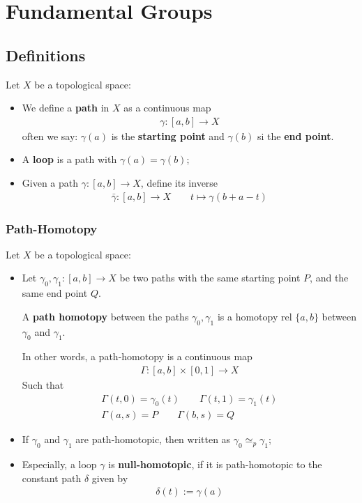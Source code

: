 \documentclass[Total.tex]{subfiles}
\begin{document}
		\chapter{Fundamental Groups}
	\section{Definitions}
	\begin{Def}
		Let $X$ be a topological space:
		\begin{itemize}
			\item We define a \textbf{path} in $X$ as a continuous map
			\begin{gather*}
				\gamma:[a,b]\rightarrow X
			\end{gather*}
			often we say: $\gamma(a)$ is the \textbf{starting point} and $\gamma(b)$ si the \textbf{end point}.
			\item A \textbf{loop} is a path with $\gamma(a)=\gamma(b)$;
			\item Given a path $\gamma:[a,b]\rightarrow X$, define its inverse 
			\begin{gather*}
				\bar{\gamma}:[a,b]\rightarrow X\qquad t\mapsto \gamma(b+a-t)
			\end{gather*}
		\end{itemize}
	\end{Def}
	
	\subsection{Path-Homotopy}
	\begin{Def}
		Let $X$ be a topological space:
		\begin{itemize}
			\item Let $\gamma_0,\gamma_1:[a,b]\rightarrow X$ be two paths with the same starting point $P$, and the same end point $Q$.
			
			A \textbf{path homotopy} between the paths $\gamma_0,\gamma_1$ is a homotopy rel $\{a,b\}$ between $\gamma_0$ and $\gamma_1$.
			
			In other words, a path-homotopy is a continuous map
			\begin{gather*}
				\Gamma:[a,b]\times [0,1]\rightarrow X
			\end{gather*}
			Such that
			\begin{gather*}
				\Gamma(t,0)=\gamma_0(t)\qquad \Gamma(t,1)=\gamma_1(t)\\
				\Gamma(a,s)=P\qquad \Gamma(b,s)=Q
			\end{gather*}
			\item If $\gamma_0$ and $\gamma_1$ are path-homotopic, then written as $\gamma_0\simeq_p \gamma_1$;
			\item Especially, a loop $\gamma$ is \textbf{null-homotopic}, if it is path-homotopic to the constant path $\delta$ given by
			\begin{gather*}
				\delta(t):=\gamma(a)
			\end{gather*}
		\end{itemize}
	\end{Def}
\end{document}
